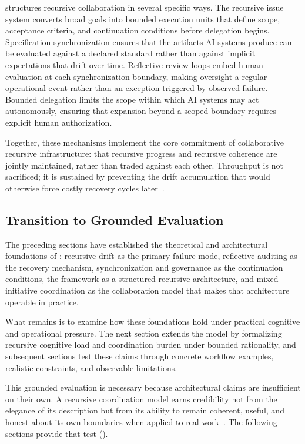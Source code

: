  structures recursive collaboration in several specific ways. The recursive issue system converts broad goals into bounded execution units that define scope, acceptance criteria, and continuation conditions before delegation begins. Specification synchronization ensures that the artifacts AI systems produce can be evaluated against a declared standard rather than against implicit expectations that drift over time. Reflective review loops embed human evaluation at each synchronization boundary, making oversight a regular operational event rather than an exception triggered by observed failure. Bounded delegation limits the scope within which AI systems may act autonomously, ensuring that expansion beyond a scoped boundary requires explicit human authorization.

Together, these mechanisms implement the core commitment of collaborative recursive infrastructure: that recursive progress and recursive coherence are jointly maintained, rather than traded against each other. Throughput is not sacrificed; it is sustained by preventing the drift accumulation that would otherwise force costly recovery cycles later~\cite{Brooks1987NoSilverBullet,Beer1972BrainFirm}.

\subsection{Transition to Grounded Evaluation}

The preceding sections have established the theoretical and architectural foundations of : recursive drift as the primary failure mode, reflective auditing as the recovery mechanism, synchronization and governance as the continuation conditions, the  framework as a structured recursive architecture, and mixed-initiative coordination as the collaboration model that makes that architecture operable in practice.

What remains is to examine how these foundations hold under practical cognitive and operational pressure. The next section extends the model by formalizing recursive cognitive load and coordination burden under bounded rationality, and subsequent sections test these claims through concrete workflow examples, realistic constraints, and observable limitations.

This grounded evaluation is necessary because architectural claims are insufficient on their own. A recursive coordination model earns credibility not from the elegance of its description but from its ability to remain coherent, useful, and honest about its own boundaries when applied to real work~\cite{Simon1957ModelsMan,Shneiderman2020HCAI}. The following sections provide that test ().
